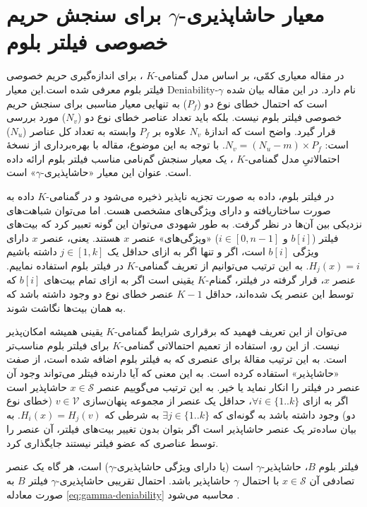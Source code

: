 \section{معیار 
	حاشاپذیری-$\gamma$ برای
	سنجش حریم خصوصی فیلتر بلوم}
\label{gamma-deniability}

در مقاله \cite{Bianchi2012} معیاری کمّی، بر اساس مدل گمنامی-$K$ 
\cite{Sweeney2002}،
برای اندازه‌گیری حریم خصوصی فیلتر بلوم معرفی شده است.این معیار
\gls{Deniability}-$\gamma$
نام دارد. در این مقاله بیان شده است که احتمال خطای نوع دو ($P_f$) به تنهایی معیار مناسبی برای سنجش حریم خصوصی فیلتر بلوم نیست. بلکه باید تعداد عناصر خطای نوع دو ($N_v$) مورد بررسی قرار گیرد. واضح است که اندازهٔ $N_v$ علاوه بر $P_f$ وابسته به تعداد کل عناصر ($N_u$) است:
$N_v=(N_u-m)\times P_f$.
با توجه به این موضوع، مقاله \cite{Bianchi2012} با بهره‌برداری از نسخهٔ احتمالاتیِ مدل گمنامی-$K$
\cite{Lodha2008}،
یک معیار سنجش گم‌نامی مناسب فیلتر بلوم ارائه داده است. عنوان این معیار «حاشاپذیری-$\gamma$» است. 

در فیلتر بلوم، داده به صورت تجزیه ناپذیر ذخیره می‌شود و در گمنامی-$K$ داده به صورت ساختاریافته و دارای ویژگی‌های مشخصی هست. اما می‌توان شباهت‌های نزدیکی بین آن‌ها در نظر گرفت. به طور شهودی می‌توان این گونه تعبیر کرد که بیت‌های فیلتر ($b[i]$ و $i\in[0,n-1]$) «ویژگی‌های» عنصر $x$ هستند. یعنی، عنصر $x$ دارای ویژگی $b[i]$ است، اگر و تنها اگر به ازای حداقل یک 
$j\in[1,k]$ داشته باشیم 
$H_j(x)=i$.
به این ترتیب می‌توانیم از تعریف گمنامی-$K$ در فیلتر بلوم استفاده نماییم. عنصر $x$، قرار گرفته در فیلتر، گمنام-$K$ یقینی است اگر به ازای تمام بیت‌های $b[i]$  که توسط این عنصر یک شده‌اند، حداقل $K-1$ عنصر خطای نوع دو وجود داشته باشد که به همان بیت‌ها نگاشت شوند.

می‌توان از این تعریف فهمید که برقراری شرایط گمنامی-$K$ یقینی همیشه امکان‌پذیر نیست. از این رو، استفاده از تعمیم احتمالاتی گمنامی-$K$ 
\cite{Lodha2008} 
برای فیلتر بلوم مناسب‌تر است. به این ترتیب مقالهٔ \cite{Bianchi2012} برای عنصری که به فیلتر بلوم اضافه شده است، از صفت «حاشاپذیر» استفاده کرده است.  به این معنی که آیا دارنده فیتلر می‌تواند وجود آن عنصر در فیلتر را انکار نماید یا خیر. به این ترتیب می‌گوییم عنصر $x\in \mathcal{S}$ حاشاپذیر است اگر به ازای 
$\forall i \in \{1..k\}$،
حداقل یک عنصر از مجموعه پنهان‌سازی $v\in \mathcal{V}$ (خطای نوع دو) وجود داشته باشد به گونه‌ای که 
$\exists j \in \{1..k\}$
به شرطی که 
$H_i(x) = H_j(v)$.
به بیان ساده‌تر یک عنصر حاشا‌پذیر است اگر بتوان بدون تغییر بیت‌های فیلتر، آن عنصر را توسط عناصری که عضو فیلتر نیستند جایگذاری کرد. 

فیلتر بلوم $B$، حاشاپذیر-$\gamma$ است (یا دارای ویژگی حاشاپذیری-$\gamma$) است، هر گاه یک عنصر تصادفی آن $x\in \mathcal{S}$ با احتمال $\gamma$ حاشاپذیر باشد. احتمال تقریبی حاشاپذیری-$\gamma$ فیلتر $B$ به صورت معادله \eqref{eq:gamma-deniability} محاسبه می‌شود  \cite{Bianchi2012}.

